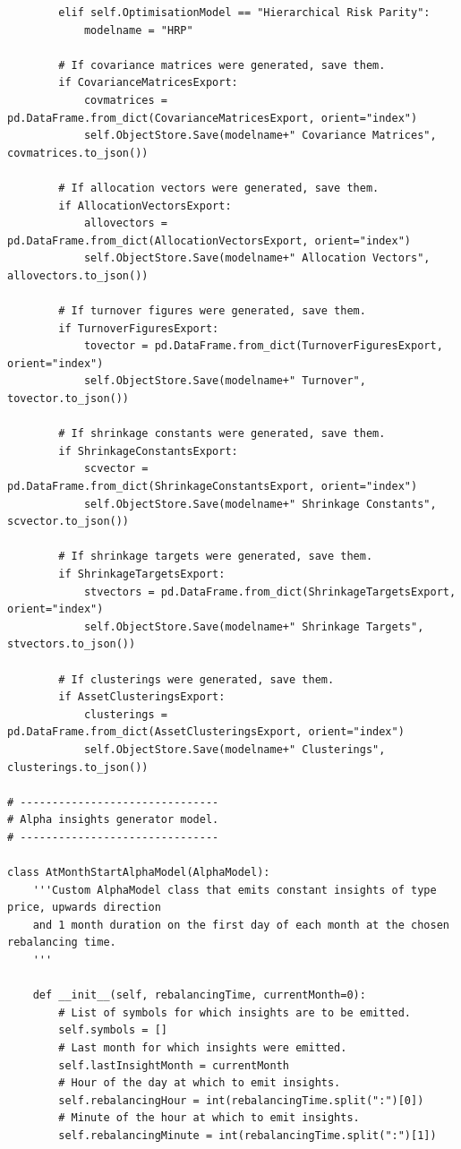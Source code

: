 \begin{verbatim}
        elif self.OptimisationModel == "Hierarchical Risk Parity":
            modelname = "HRP"
        
        # If covariance matrices were generated, save them.
        if CovarianceMatricesExport:
            covmatrices = pd.DataFrame.from_dict(CovarianceMatricesExport, orient="index")
            self.ObjectStore.Save(modelname+" Covariance Matrices", covmatrices.to_json())
        
        # If allocation vectors were generated, save them.
        if AllocationVectorsExport:
            allovectors = pd.DataFrame.from_dict(AllocationVectorsExport, orient="index")
            self.ObjectStore.Save(modelname+" Allocation Vectors", allovectors.to_json())
            
        # If turnover figures were generated, save them.
        if TurnoverFiguresExport:
            tovector = pd.DataFrame.from_dict(TurnoverFiguresExport, orient="index")
            self.ObjectStore.Save(modelname+" Turnover", tovector.to_json())
            
        # If shrinkage constants were generated, save them.
        if ShrinkageConstantsExport:
            scvector = pd.DataFrame.from_dict(ShrinkageConstantsExport, orient="index")
            self.ObjectStore.Save(modelname+" Shrinkage Constants", scvector.to_json())
            
        # If shrinkage targets were generated, save them.
        if ShrinkageTargetsExport:
            stvectors = pd.DataFrame.from_dict(ShrinkageTargetsExport, orient="index")
            self.ObjectStore.Save(modelname+" Shrinkage Targets", stvectors.to_json())
            
        # If clusterings were generated, save them.
        if AssetClusteringsExport:
            clusterings = pd.DataFrame.from_dict(AssetClusteringsExport, orient="index")
            self.ObjectStore.Save(modelname+" Clusterings", clusterings.to_json())

# -------------------------------
# Alpha insights generator model.
# -------------------------------
      
class AtMonthStartAlphaModel(AlphaModel):
    '''Custom AlphaModel class that emits constant insights of type price, upwards direction
    and 1 month duration on the first day of each month at the chosen rebalancing time.
    '''
    
    def __init__(self, rebalancingTime, currentMonth=0):
        # List of symbols for which insights are to be emitted.
        self.symbols = []
        # Last month for which insights were emitted.
        self.lastInsightMonth = currentMonth
        # Hour of the day at which to emit insights.
        self.rebalancingHour = int(rebalancingTime.split(":")[0])
        # Minute of the hour at which to emit insights.
        self.rebalancingMinute = int(rebalancingTime.split(":")[1])
    

\end{verbatim}
